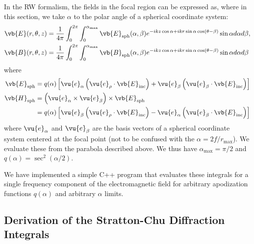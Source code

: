 \documentclass[11pt,SymmetricalJury]{inrsthesis/inrsthesis}
\begin{document}
In the RW formalism, the fields in the focal region can be expressed as, where
in this section, we take $\alpha$ to the polar angle of a spherical coordinate
system\cite{April2012}:
  \begin{align}
    \vb{E}(r,\theta,z) &= \frac{1}{4\pi}\int_0^{2\pi}\int_0^{\alpha_\text{max}}
        \vb{E}_\text{sph}(\alpha,\beta)e^{-ikz\cos\alpha+ikr\sin\alpha\cos(\theta-\beta)}
        \sin\alpha d\alpha d\beta, \\
    \vb{B}(r,\theta,z) &= \frac{1}{4\pi}\int_0^{2\pi}\int_0^{\alpha_\text{max}}
        \vb{B}_\text{sph}(\alpha,\beta)e^{-ikz\cos\alpha+ikr\sin\alpha\cos(\theta-\beta)}
        \sin\alpha d\alpha d\beta
  \end{align}
where
  \begin{align}
    \vb{E}_\text{sph} &= q(\alpha)\left[\vu{e}_\alpha\left(\vu{e}_\rho\cdot\vb{E}_\text{inc}\right)
                                       +\vu{e}_\beta\left(\vu{e}_\beta\cdot\vb{E}_\text{inc}\right)
                                       \right] \\
    \vb{H}_\text{sph} &= \left(\vu{e}_\alpha\times\vu{e}_\beta\right)\times\vb{E}_\text{sph}\nonumber\\
                      &= q(\alpha) \left[\vu{e}_\beta\left(\vu{e}_\rho\cdot\vb{E}_\text{inc}\right)
                                        -\vu{e}_\alpha\left(\vu{e}_\beta\cdot\vb{E}_\text{inc}\right)
                                        \right]
  \end{align}
where $\vu{e}_\alpha$ and $\vu{e}_\beta$ are the basis vectors of a spherical
coordinate system centered at the focal point (not to be confused with the
$\alpha=2f/r_\text{max}$). We evaluate these from the parabola described above.
We thus have $\alpha_\text{max}=\pi/2$ and $q(\alpha)=\sec^2(\alpha/2)$.

We have implemented a simple C++ program that evaluates these integrals for a
single frequency component of the electromagnetic field for arbitrary
apodization functions $q(\alpha)$ and arbitrary $\alpha$ limits.


\subsection{Derivation of the Stratton-Chu Diffraction Integrals}
\end{document}
